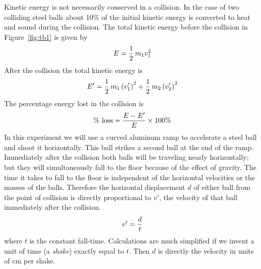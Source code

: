      Kinetic energy is not necessarily conserved in a collision.  In the
case of two colliding steel balls about 10\% of the initial kinetic
energy is converted to heat and sound during the collision.  The total
kinetic energy before the collision in Figure~\ref{fig:tb1} is given by
\begin{equation}
E = {{1} \over {2}} \, m_1 v_{1}^{2}  \label{eq:tb3}
\end{equation}
 After the collision the total kinetic energy is
\begin{equation}
E' = {{1} \over {2}} \, m_1 \left( v_{1}' \right)^{2} + {{1} \over {2}} \,
      m_2 \left( v_{2}' \right)^{2}  \label{eq:tb4}
\end{equation}
 The percentage energy lost in the collision is
\begin{equation}
\mbox{\% loss} = {{E - E'} \over {E}} \times 100\%  \label{eq:tb5}
\end{equation}
     In this experiment we will use a curved aluminum ramp to accelerate
a steel ball and shoot it horizontally.  This ball strikes a second ball
at the end of the ramp.  Immediately after the collision both balls will
be traveling nearly horizontally; but they will simultaneously fall to the
floor because of the effect of gravity.  The time it takes to fall to
the floor is independent of the horizontal velocities or the masses of
the balls.  Therefore the horizontal displacement $d$ of either ball from
the point of collision is directly proportional to $v'$, the velocity of
that ball immediately after the collision.
\begin{equation}
v' = {d\over t}  \label{eq:tb6}
\end{equation}
where $t$ is the constant fall-time.%
Calculations are much simplified if we invent a unit of time
(a {\em shake}) exactly equal to $t$.  Then $d$ is directly the
velocity in units of cm per shake.


